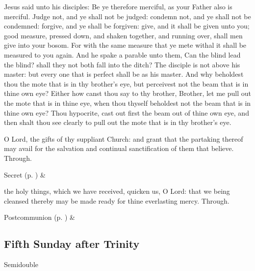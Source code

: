  Jesus said unto his disciples: Be ye therefore merciful, as your Father also is merciful. Judge not, and ye shall not be judged: condemn not, and ye shall not be condemned: forgive, and ye shall be forgiven: give, and it shall be given unto you; good measure, pressed down, and shaken together, and running over, shall men give into your bosom. For with the same measure that ye mete withal it shall be measured to you again. And he spake a parable unto them, Can the blind lead the blind? shall they not both fall into the ditch? The disciple is not above his master: but every one that is perfect shall be as his master. And why beholdest thou the mote that is in thy brother's eye, but perceivest not the beam that is in thine own eye? Either how canst thou say to thy brother, Brother, let me pull out the mote that is in thine eye, when thou thyself beholdest not the beam that is in thine own eye? Thou hypocrite, cast out first the beam out of thine own eye, and then shalt thou see clearly to pull out the mote that is in thy brother's eye.


\secret
{} O Lord, the gifts of thy suppliant Church: and grant that the partaking thereof may avail for the salvation and continual sanctification of them that believe. Through.
\begin{rubric}
     Secret  (p. \pageref{SPSaints}) \&  
\end{rubric}



\postcommunion
{} the holy things, which we have received, quicken us, O Lord: that we being cleansed thereby may be made ready for thine everlasting mercy. Through.
\begin{rubric}
     Postcommunion  (p. \pageref{SPSaints}) \&  
\end{rubric}


\clearpage
\subsection{Fifth Sunday after Trinity}
\begin{inhead}
    {Semidouble}
\end{inhead}

